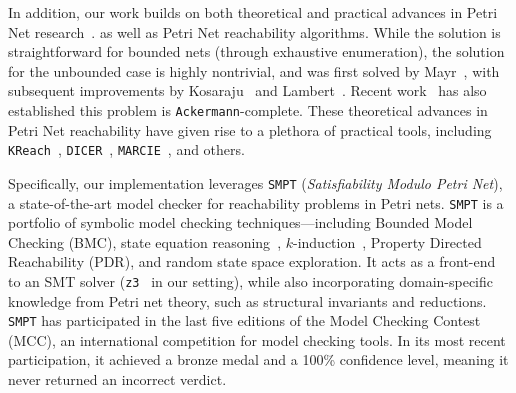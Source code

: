 In addition, our work builds on both theoretical and practical advances in 
Petri Net research~\cite{Mu89, Es96, Re12, EsNi24}. 
%
as well as Petri Net reachability algorithms. While the solution is 
straightforward for bounded nets (through exhaustive enumeration), the solution 
for the unbounded case is highly nontrivial, and was first solved by 
Mayr~\cite{Ma81}, with subsequent improvements by Kosaraju~\cite{Ko82} and 
Lambert~\cite{La92}. Recent work~\cite{CzWo22} has also established this 
problem is \texttt{Ackermann}-complete.
%
These theoretical advances in Petri Net reachability have given rise to a 
plethora of practical tools, including \texttt{KReach}~\cite{DiLa20}, 
\texttt{DICER}~\cite{XiZhLi21}, \texttt{MARCIE}~\cite{HeRoSc13}, and others. 

Specifically, our implementation leverages \texttt{SMPT} (\emph{Satisfiability Modulo Petri Net})\cite{AmDa23}, a state-of-the-art model checker for reachability problems in Petri nets. \texttt{SMPT} is a portfolio of symbolic model checking techniques—including Bounded Model Checking (BMC)\cite{biere_symbolic_1999}, state equation reasoning~\cite{murata_state_1977}, $k$-induction~\cite{sheeran_checking_2000}, Property Directed Reachability (PDR)\cite{bradley_sat-based_2011,AmDaHu22}, and random state space exploration. It acts as a front-end to an SMT solver (\texttt{z3}~\cite{DeBj08} in our setting), while also incorporating domain-specific knowledge from Petri net theory, such as structural invariants and reductions. \texttt{SMPT} has participated in the last five editions of the Model Checking Contest (MCC), an international competition for model checking tools. In its most recent participation, it achieved a bronze medal and a 100\% confidence level, meaning it never returned an incorrect verdict\cite{mcc:2025}.


